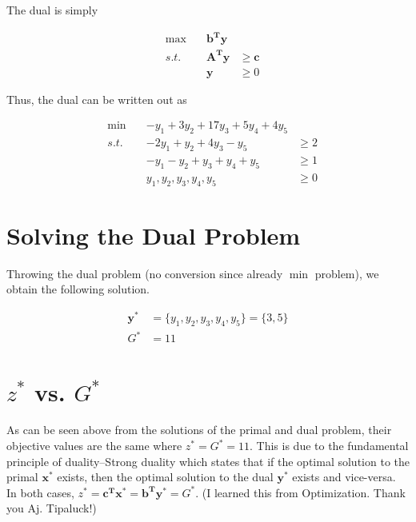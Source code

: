 The dual is simply

\begin{equation}
    \begin{aligned}
	& \max\quad& \mathbf{b^T y} & \\
    & s.t.\quad & \mathbf{A^T y} &\geq \mathbf c \\
	&& \mathbf y &\geq 0
    \end{aligned}
\end{equation}

Thus, the dual can be written out as

\begin{equation}
    \begin{aligned}
    & \min\quad& -y_1 +3y_2 +17y_3 +5y_4 +4y_5 & \\
    & s.t.\quad 
        &-2y_1 +y_2 +4y_3 -y_5 &\geq 2 \\
        &&-y_1 -y_2 +y_3 +y_4 +y_5 &\geq 1 \\
        &&y_1, y_2, y_3, y_4, y_5 &\geq 0
    \end{aligned}
\end{equation}

\section{Solving the Dual Problem}

Throwing the dual problem (no conversion since already $\min$ problem), we obtain the following solution.

\begin{equation}
    \begin{aligned}
		\mathbf y^* &= \{y_1, y_2, y_3, y_4, y_5\} = \{3, 5\} \\
		G^* &= 11
    \end{aligned}
\end{equation}

\section{$z^*$ vs. $G^*$}

As can be seen above from the solutions of the primal and dual problem, their objective values are the same where $z^* = G^* = 11$.
This is due to the fundamental principle of duality--Strong duality which states that if the optimal solution to the primal $\mathbf x^*$ exists, then the optimal solution to the dual $\mathbf y^*$ exists and vice-versa. In both cases, $z^* = \mathbf{c^T x^*} = \mathbf{b^T y^*} = G^*$.
(I learned this from Optimization. Thank you Aj. Tipaluck!)
